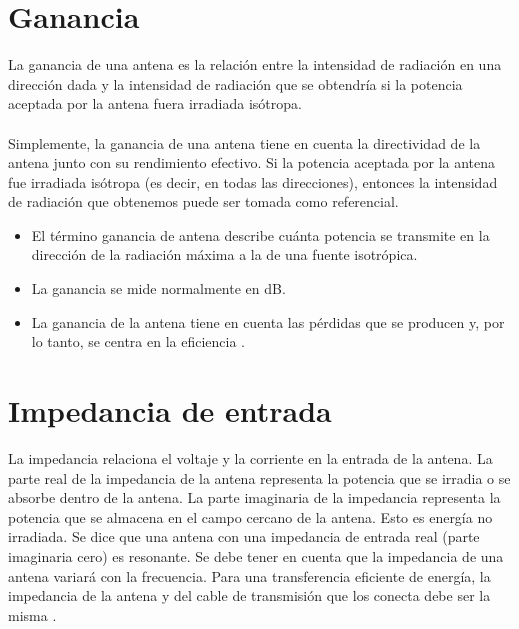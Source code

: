 \documentclass[12pt,letterpaper]{article}
\begin{document}
\section{Ganancia}
La ganancia de una antena es la relación entre la intensidad de radiación en una dirección 
dada y la intensidad de radiación que se obtendría si la potencia aceptada por la antena 
fuera irradiada isótropa.
\\ \\
Simplemente, la ganancia de una antena tiene en cuenta la directividad de la antena junto 
con su rendimiento efectivo. Si la potencia aceptada por la antena fue irradiada isótropa 
(es decir, en todas las direcciones), entonces la intensidad de radiación que obtenemos 
puede ser tomada como referencial.
\begin{itemize}
    \item El término ganancia de antena describe cuánta potencia se transmite en la 
    dirección de la radiación máxima a la de una fuente isotrópica.
    \item La ganancia se mide normalmente en dB.
    \item La ganancia de la antena tiene en cuenta las pérdidas que se producen y, 
    por lo tanto, se centra en la eficiencia \cite{polarizacion}.
\end{itemize}

\section{Impedancia de entrada}
La impedancia relaciona el voltaje y la corriente en la entrada de la antena. La 
parte real de la impedancia de la antena representa la potencia que se irradia o se 
absorbe dentro de la antena. La parte imaginaria de la impedancia representa la potencia 
que se almacena en el campo cercano de la antena. Esto es energía no irradiada. Se dice 
que una antena con una impedancia de entrada real (parte imaginaria cero) es resonante. 
Se debe tener en cuenta que la impedancia de una antena variará con la frecuencia. Para 
una transferencia eficiente de energía, la impedancia de la antena y del cable de 
transmisión que los conecta debe ser la misma \cite{polarizacion}. 

\newpage
\end{document}
